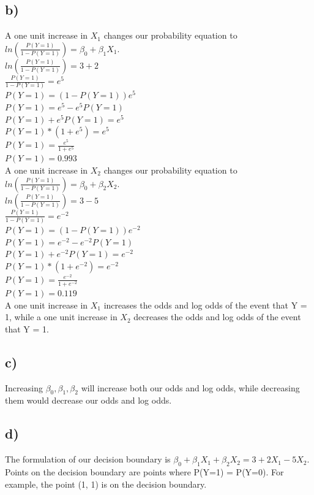 \documentclass[12pt, letterpaper]{article}
\begin{document}
\subsection*{b)} A one unit increase in $X_1$ changes our probability equation to $ln(\frac{P(Y=1)}{1-P(Y=1)}) = \beta_0 + \beta_1X_1$.\\
$ln(\frac{P(Y=1)}{1-P(Y=1)}) = 3 + 2$\\
$\frac{P(Y=1)}{1-P(Y=1)} = e^5$\\
$P(Y=1) = (1-P(Y=1))e^5$\\
$P(Y=1) = e^5-e^5P(Y=1)$\\
$P(Y=1) + e^5P(Y=1) = e^5$\\
$P(Y=1)*(1 + e^5) = e^5$\\
$P(Y=1) = \frac{e^5}{1 + e^5}$\\
$P(Y=1) = 0.993$\\
A one unit increase in $X_2$ changes our probability equation to $ln(\frac{P(Y=1)}{1-P(Y=1)}) = \beta_0 + \beta_2X_2$.\\
$ln(\frac{P(Y=1)}{1-P(Y=1)}) = 3 - 5$\\
$\frac{P(Y=1)}{1-P(Y=1)} = e^{-2}$\\
$P(Y=1) = (1-P(Y=1))e^{-2}$\\
$P(Y=1) = e^{-2}-e^{-2}P(Y=1)$\\
$P(Y=1) + e^{-2}P(Y=1) = e^{-2}$\\
$P(Y=1)*(1 + e^{-2}) = e^{-2}$\\
$P(Y=1) = \frac{e^{-2}}{1 + e^{-2}}$\\
$P(Y=1) = 0.119$\\
A one unit increase in $X_1$ increases the odds and log odds of the event that Y = 1, while a one unit increase in $X_2$ decreases the odds and log odds of the event that Y = 1.

\subsection*{c)} Increasing $\beta_0, \beta_1, \beta_2$ will increase both our odds and log odds, while decreasing them would decrease our odds and log odds.

\subsection*{d)} The formulation of our decision boundary is $\beta_0 + \beta_1X_1 + \beta_2X_2 = 3 + 2X_1 - 5X_2$. Points on the decision boundary are points where P(Y=1) = P(Y=0). For example, the point (1, 1) is on the decision boundary.
\end{document}
